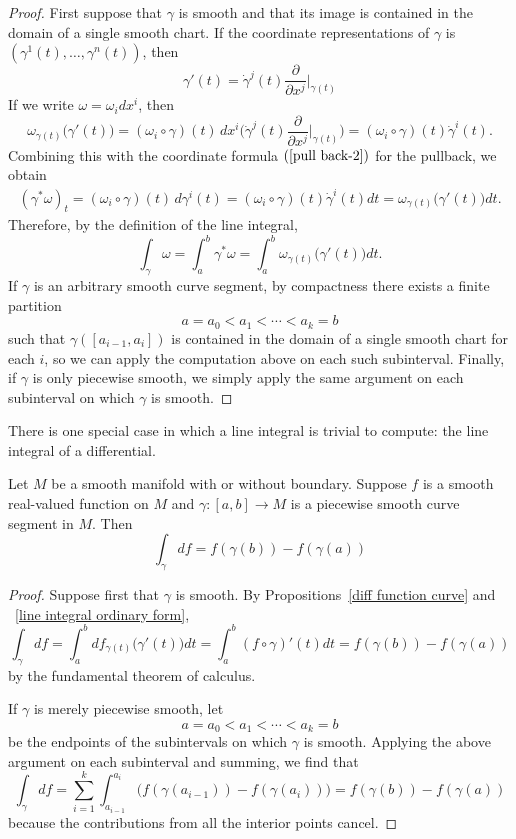 \begin{proof}
First suppose that $\gamma$ is smooth and that its image is contained in the domain of a single smooth chart. If the coordinate representations of $\gamma$ is $(\gamma^1(t),\dots,\gamma^n(t))$, then
\[\gamma'(t)=\dot{\gamma}^j(t)\frac{\partial}{\partial x^j}\Big|_{\gamma(t)}\] 
If we write $\omega=\omega_idx^i$, then
\[\omega_{\gamma(t)}\big(\gamma'(t)\big)=(\omega_i\circ\gamma)(t)\,dx^i\Big(\dot{\gamma}^j(t)\frac{\partial}{\partial x^j}\Big|_{\gamma(t)}\Big)=(\omega_i\circ\gamma)(t)\dot{\gamma}^i(t).\]
Combining this with the coordinate formula $(\ref{pull back-2})$ for the pullback, we obtain
\begin{align*}
(\gamma^*\omega)_t=(\omega_i\circ\gamma)(t)\,d\gamma^i(t)=(\omega_i\circ\gamma)(t)\dot{\gamma}^i(t)dt=\omega_{\gamma(t)}\big(\gamma'(t)\big)dt.
\end{align*}
Therefore, by the definition of the line integral,
\[\int_{\gamma}\omega=\int_{a}^{b}\gamma^*\omega=\int_{a}^{b}\omega_{\gamma(t)}\big(\gamma'(t)\big)dt.\]
If $\gamma$ is an arbitrary smooth curve segment, by compactness there exists a finite partition 
\[a=a_0<a_1<\cdots<a_k=b\] 
such that $\gamma([a_{i-1},a_i])$ is contained in the domain of a single smooth chart for each $i$, so we can apply the computation above on each such subinterval. Finally, if $\gamma$ is only piecewise smooth, we simply apply the same argument on each subinterval on which $\gamma$ is smooth.
\end{proof}
There is one special case in which a line integral is trivial to compute: the line integral of a differential.
\begin{proposition}\label{line integral fundamental thm}
Let $M$ be a smooth manifold with or without boundary. Suppose $f$ is a smooth real-valued function on $M$ and $\gamma:[a,b]\to M$ is a piecewise smooth curve segment in $M$. Then
\[\int_{\gamma}df=f(\gamma(b))-f(\gamma(a))\]
\end{proposition}
\begin{proof}
Suppose first that $\gamma$ is smooth. By Propositions~\ref{diff function curve} and ~\ref{line integral ordinary form},
\[\int_\gamma df=\int_{a}^{b}df_{\gamma(t)}\big(\gamma'(t)\big)dt=\int_{a}^{b}(f\circ\gamma)'(t)dt=f(\gamma(b))-f(\gamma(a))\]
by the fundamental theorem of calculus.\par
If $\gamma$ is merely piecewise smooth, let 
\[a=a_0<a_1<\cdots<a_k=b\] 
be the endpoints of the subintervals on which $\gamma$ is smooth. Applying the above argument on each subinterval and summing, we find that
\[\int_\gamma df=\sum_{i=1}^{k}\int_{a_{i-1}}^{a_i}\big(f(\gamma(a_{i-1}))-f(\gamma(a_i))\big)=f(\gamma(b))-f(\gamma(a))\]
because the contributions from all the interior points cancel.
\end{proof}
